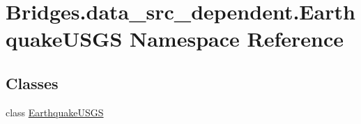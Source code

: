 \hypertarget{namespace_bridges_1_1data__src__dependent_1_1_earthquake_u_s_g_s}{}\section{Bridges.\+data\+\_\+src\+\_\+dependent.\+Earthquake\+U\+S\+G\+S Namespace Reference}
\label{namespace_bridges_1_1data__src__dependent_1_1_earthquake_u_s_g_s}
\subsection*{Classes}
\begin{DoxyCompactItemize}
\item 
class \hyperlink{class_bridges_1_1data__src__dependent_1_1_earthquake_u_s_g_s_1_1_earthquake_u_s_g_s}{Earthquake\+U\+S\+G\+S}
\end{DoxyCompactItemize}
